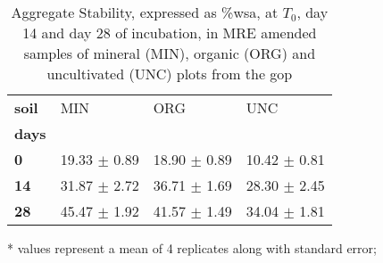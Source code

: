 \begin{table}[H]
\centering
\caption{Aggregate Stability, expressed as \%\gls{wsa}, at $ T_0 $, day 14 and day 28 of incubation, in MRE amended samples of mineral (MIN), organic (ORG) and uncultivated (UNC) plots from the \gls{gop}}
\label{as_main_treated}
\begin{threeparttable}
\begin{tabular}{llll}
\toprule
\textbf{soil} &            MIN &            ORG &            UNC \\
\textbf{days} &                &                &                \\
\midrule
\textbf{0   } &  19.33 $ \pm $  0.89 &  18.90 $ \pm $  0.89 &  10.42 $ \pm $  0.81 \\
\textbf{14  } &  31.87 $ \pm $  2.72 &  36.71 $ \pm $  1.69 &  28.30 $ \pm $  2.45 \\
\textbf{28  } &  45.47 $ \pm $  1.92 &  41.57 $ \pm $  1.49 &  34.04 $ \pm $  1.81 \\
\bottomrule
\end{tabular}

\begin{tablenotes}
	\item[*] \scriptsize values represent a mean of 4 replicates along with standard error;
\end{tablenotes}

\end{threeparttable}
\end{table}

